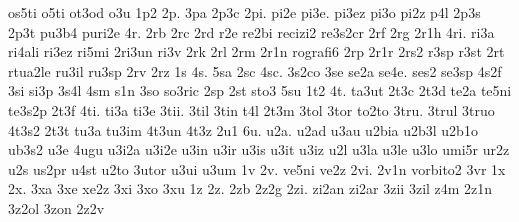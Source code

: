 {os5ti
o5ti
ot3od
o3u
1p2
2p.
3pa
2p3c
2pi.
pi2e
pi3e.
pi3ez
pi3o
pi2z
p4l
2p3s
2p3t
pu3b4
puri2e
4r.
2rb
2rc
2rd
r2e
re2bi
recizi2
re3s2cr
2rf
2rg
2r1h
4ri.
ri3a
ri4ali
ri3ez
ri5mi
2ri3un
ri3v
2rk
2rl
2rm
2r1n
rografi6
2rp
2r1r
2rs2
r3sp
r3st
2rt
rtua2le
ru3il
ru3sp
2rv
2rz
1s
4s.
5sa
2sc
4sc.
3s2co
3se
se2a
se4e.
ses2
se3sp
4s2f
3si
si3p
3s4l
4sm
s1n
3so
so3ric
2sp
2st
sto3
5su
1t2
4t.
ta3ut
2t3c
2t3d
te2a
te5ni
te3s2p
2t3f
4ti.
ti3a
ti3e
3tii.
3til
3tin
t4l
2t3m
3tol
3tor
to2to
3tru.
3trul
3truo
4t3s2
2t3t
tu3a
tu3im
4t3un
4t3z
2u1
6u.
u2a.
u2ad
u3au
u2bia
u2b3l
u2b1o
ub3s2
u3e
4ugu
u3i2a
u3i2e
u3in
u3ir
u3is
u3it
u3iz
u2l
u3la
u3le
u3lo
umi5r
ur2z
u2s
us2pr
u4st
u2to
3utor
u3ui
u3um
1v
2v.
ve5ni
ve2z
2vi.
2v1n
vorbito2
3vr
1x
2x.
3xa
3xe
xe2z
3xi
3xo
3xu
1z
2z.
2zb
2z2g
2zi.
zi2an
zi2ar
3zii
3zil
z4m
2z1n
3z2ol
3zon
2z2v
}
\endgroup
\relax\endinput
